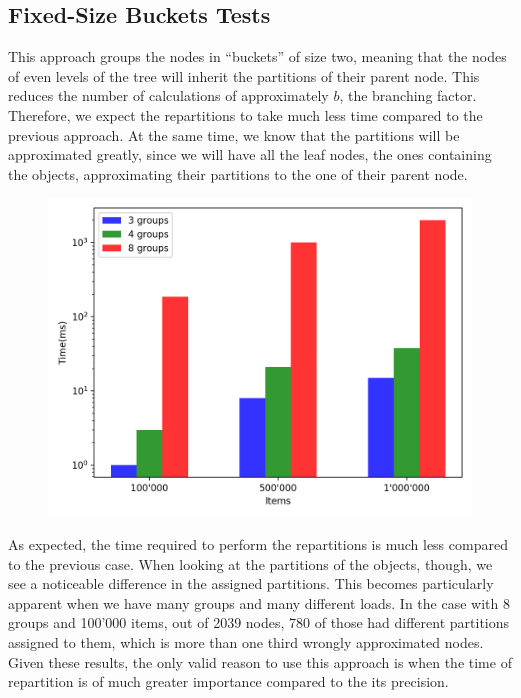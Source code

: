 \subsection{Fixed-Size Buckets Tests}\label{sec:fixed-size buckets-tests}
This approach groups the nodes in ``buckets'' of size two, meaning that the nodes of even levels of the tree will inherit the partitions of their parent node. This reduces the number of calculations of approximately $b$, the branching factor. Therefore, we expect the repartitions to take much less time compared to the previous approach. At the same time, we know that the partitions will be approximated greatly, since we will have all the leaf nodes, the ones containing the objects, approximating their partitions to the one of their parent node.

\begin{figure}[!htb]
  \centering
  \includegraphics[width=\textwidth,height=\textheight,keepaspectratio]{img/fixed.png}
  \caption[caption]{ }
  \label{fig:fixed}
\end{figure}

As expected, the time required to perform the repartitions is much less compared to the previous case. When looking at the partitions of the objects, though, we see a noticeable difference in the assigned partitions. This becomes particularly apparent when we have many groups and many different loads. In the case with 8 groups and 100'000 items, out of 2039 nodes, 780 of those had different partitions assigned to them, which is more than one third wrongly approximated nodes. Given these results, the only valid reason to use this approach is when the time of repartition is of much greater importance compared to the its precision.

